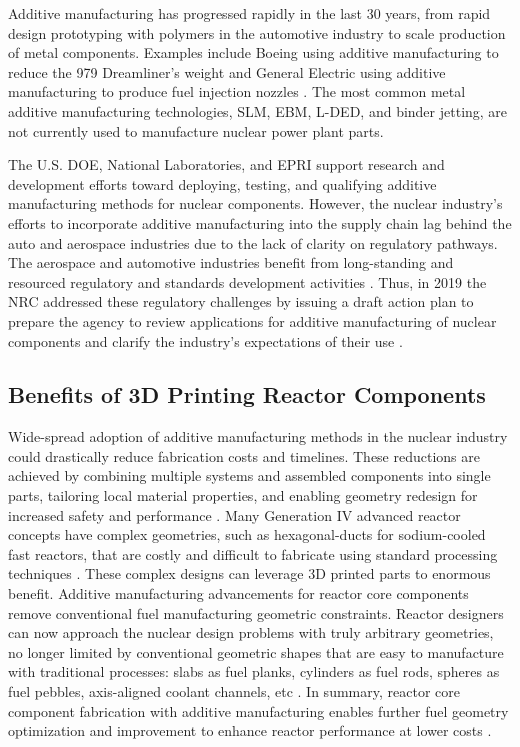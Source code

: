 Additive manufacturing has progressed rapidly in the last 30 years, from rapid 
design prototyping with polymers in the automotive industry to scale production 
of metal components.  
Examples include Boeing using additive manufacturing to reduce the 979 
Dreamliner's weight \cite{noauthor_printed_2017} and General Electric using 
additive manufacturing to produce fuel injection nozzles 
\cite{noauthor_transformation_2018}. 
The most common metal additive manufacturing technologies, \gls{SLM}, \gls{EBM}, 
\gls{L-DED}, and binder jetting, are not currently used to manufacture nuclear 
power plant parts. 

The U.S. \gls{DOE}, National Laboratories, and \gls{EPRI} support research and 
development efforts toward deploying, testing, and qualifying additive 
manufacturing methods for nuclear components. 
However, the nuclear industry's efforts to incorporate additive manufacturing 
into the supply chain lag behind the auto and aerospace industries due to the 
lack of clarity on regulatory pathways. 
The aerospace and automotive industries benefit from long-standing and resourced 
regulatory and standards development activities \cite{noauthor_roadmap_nodate}. 
Thus, in 2019 the \gls{NRC} addressed these regulatory challenges by issuing 
a draft action plan to prepare the agency to review applications for 
additive manufacturing of nuclear components and clarify the industry's 
expectations of their use \cite{noauthor_roadmap_nodate}.

\subsection{Benefits of 3D Printing Reactor Components}
\label{sec:am}
Wide-spread adoption of additive manufacturing methods in the nuclear industry 
could drastically reduce fabrication costs and timelines.
These reductions are achieved by combining multiple systems and assembled 
components into single parts, tailoring local material properties, and enabling 
geometry redesign for increased safety and performance 
\cite{simpson_considerations_2019}. 
Many Generation IV advanced reactor concepts have complex geometries, 
such as hexagonal-ducts for sodium-cooled fast reactors, that are costly and difficult 
to fabricate using standard processing techniques \cite{sridharan_performance_2019}.  
These complex designs can leverage 3D printed parts to enormous benefit. 
Additive manufacturing advancements for reactor core components remove
conventional fuel manufacturing geometric constraints.
Reactor designers can now approach the nuclear design problems with truly 
arbitrary geometries, no longer limited by conventional geometric shapes that are 
easy to manufacture with traditional processes: slabs as fuel planks, cylinders 
as fuel rods, spheres as fuel pebbles, axis-aligned coolant channels, etc 
\cite{sobes_artificial_2020}.
In summary, reactor core component fabrication with additive manufacturing 
enables further fuel geometry optimization and improvement to enhance 
reactor performance at lower costs \cite{bergeron_early_2018}. 

